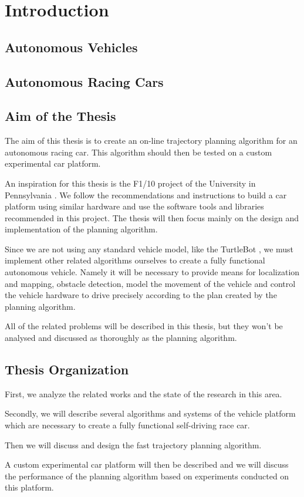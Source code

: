 \chapter*{Introduction}

\section*{Autonomous Vehicles}

\section*{Autonomous Racing Cars}

\section*{Aim of the Thesis}

The aim of this thesis is to create an on-line trajectory planning algorithm for an autonomous racing car. This algorithm should then be tested on a custom experimental car platform.

An inspiration for this thesis is the F1/10 project of the University in Pennsylvania \cite{f1tenth}. We follow the recommendations and instructions to build a car platform using similar hardware and use the software tools and libraries recommended in this project. The thesis will then focus mainly on the design and implementation of the planning algorithm.

Since we are not using any standard vehicle model, like the TurtleBot \cite{turtlebot}, we must implement other related algorithms ourselves to create a fully functional autonomous vehicle. Namely it will be necessary to provide means for localization and mapping, obstacle detection, model the movement of the vehicle and control the vehicle hardware to drive precisely according to the plan created by the planning algorithm.

All of the related problems will be described in this thesis, but they won't be analysed and discussed as thoroughly as the planning algorithm.

\section*{Thesis Organization}

First, we analyze the related works and the state of the research in this area.

Secondly, we will describe several algorithms and systems of the vehicle platform which are necessary to create a fully functional self-driving race car.

Then we will discuss and design the fast trajectory planning algorithm.

A custom experimental car platform will then be described and we will discuss the performance of the planning algorithm based on experiments conducted on this platform.